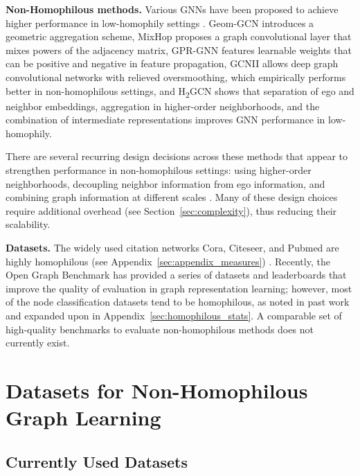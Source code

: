 \documentclass{article}
\newcommand{\myparagraph}[1]{\noindent \textbf{#1}}
\begin{document}
\myparagraph{Non-Homophilous methods.} Various GNNs have been proposed to achieve higher performance in low-homophily settings \cite{zhu2020beyond, nonlocal, zhu2020graph, chien2021adaptive, chen2020simple, yan2021two,  kim2021how, jin2021node}. Geom-GCN \cite{pei2019geom} introduces a geometric aggregation scheme, MixHop \cite{abu2019mixhop} proposes a graph convolutional layer that mixes powers of the adjacency matrix, GPR-GNN \cite{chien2021adaptive} features learnable weights that can be positive and negative in feature propagation, GCNII \cite{chen2020simple} allows deep graph convolutional networks with relieved oversmoothing, which empirically performs better in non-homophilous settings, and H\textsubscript{2}GCN \cite{zhu2020beyond} shows that separation of ego and neighbor embeddings, aggregation in higher-order neighborhoods, and the combination of intermediate representations improves GNN performance in low-homophily. 

There are several recurring design decisions across these methods that appear to strengthen performance in non-homophilous settings: using higher-order neighborhoods, decoupling neighbor information from ego information, and combining graph information at different scales \cite{zhu2020beyond}. Many of these design choices require additional overhead (see Section~\ref{sec:complexity}), thus reducing their scalability.


\myparagraph{Datasets.} The widely used citation networks Cora, Citeseer, and Pubmed \cite{sen2008collective, yang2016revisiting} are highly homophilous (see Appendix~\ref{sec:appendix_measures}) \cite{zhu2020beyond}. Recently, the Open Graph Benchmark \cite{hu2020open} has provided a series of datasets and leaderboards that improve the quality of evaluation in graph representation learning; however, most of the node classification datasets tend to be homophilous, as noted in past work \cite{zhu2020beyond} and expanded upon in Appendix~\ref{sec:homophilous_stats}. A comparable set of high-quality benchmarks to evaluate non-homophilous methods does not currently exist. 

\section{Datasets for Non-Homophilous Graph Learning}

\subsection{Currently Used Datasets}
\end{document}
